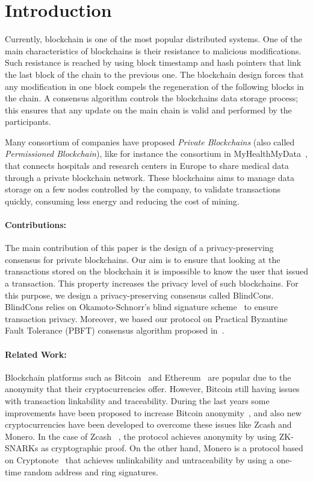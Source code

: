 \documentclass[conference]{IEEEtran}
\newcommand{\name}{BlindCons}
\begin{document}
\section{Introduction} \label{intro}

Currently, blockchain is one of the most popular distributed systems. One of the main characteristics of blockchains is their resistance to malicious modifications. Such resistance is reached by using block timestamp and hash pointers that link the last block of the chain to the previous one. The blockchain design forces that any modification in one block compels the regeneration of the following blocks in the chain. A consensus algorithm controls the blockchains data storage process; this ensures that any update on the main chain is valid and performed by the participants.

Many consortium of companies have proposed  \emph{Private Blockchains} (also called \emph{Permissioned Blockchain}), like for instance the consortium in MyHealthMyData~\cite{MHMD}, that connects hospitals and research centers in Europe to share medical data through a private blockchain network. These blockchains aims to manage data storage on a few nodes controlled by the company, to validate transactions quickly, consuming less energy and  reducing the cost of mining. 


\paragraph*{Contributions:} The main contribution of this paper is the design of a privacy-preserving consensus for private blockchains. Our aim is to ensure that looking at the transactions stored on the blockchain it is impossible to know the user that issued a transaction. This property increases the privacy  level of such blockchains. For this purpose, we design a privacy-preserving consensus called \name{}. \name{} relies on Okamoto-Schnorr's blind signature scheme~\cite{okamoto1992provably} to ensure transaction privacy. Moreover, we based our protocol on Practical Byzantine Fault Tolerance (PBFT) consensus algorithm proposed in~\cite{castro1999practical}.


\paragraph*{Related Work:}
Blockchain platforms such as Bitcoin~\cite{nakamoto2008bitcoin} and Ethereum~\cite{wood2014ethereum} are popular due to the anonymity that their cryptocurrencies offer. However, Bitcoin still having issues with transaction linkability and traceability.  During the last years some improvements have been proposed to increase Bitcoin anonymity~\cite{saxena2014increasing}, and also new cryptocurrencies have been developed to overcome these issues like Zcash and Monero. In the case of Zcash ~\cite{hopwood2016zcash}, the protocol achieves anonymity by using ZK-SNARKs as cryptographic proof. On the other hand, Monero is a protocol based on Cryptonote~\cite{van2013cryptonote} that achieves unlinkability and untraceability by using a one-time random address and ring signatures.
\end{document}
